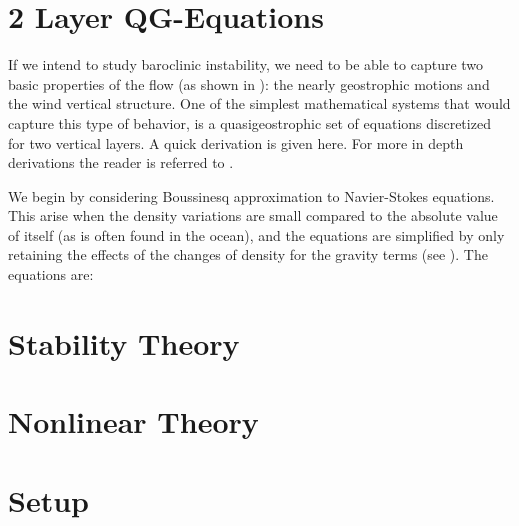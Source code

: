 \section{2 Layer QG-Equations}
\label{s:qg}
If we intend to study baroclinic instability, we need to be able to
capture two basic properties of the flow (as shown in
): the nearly geostrophic motions and the wind vertical
structure. One of the simplest mathematical systems that would capture
this type of behavior, is a quasigeostrophic set of equations discretized
for two vertical layers. A quick derivation is given here. For more in
depth derivations the  reader is referred to
.

We begin by considering Boussinesq approximation to Navier-Stokes
equations. This arise when the density variations are small compared to
the absolute value of itself (as is often found in the ocean), and the
equations are simplified by only retaining the effects of the changes of
density for the gravity terms (see ). The equations are:




\section{Stability Theory}
\label{s:stability}
\section{Nonlinear Theory}
\label{s:nonlinear}
\section{Setup}
\label{s:setup}
